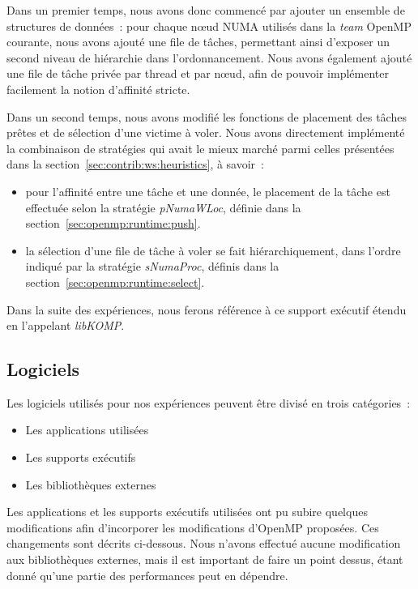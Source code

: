 Dans un premier temps, nous avons donc commencé par ajouter un ensemble de structures de données~: pour chaque nœud NUMA utilisés dans la \emph{team} OpenMP courante, nous avons ajouté une file de tâches, permettant ainsi d'exposer un second niveau de hiérarchie dans l'ordonnancement.
Nous avons également ajouté une file de tâche privée par thread et par nœud, afin de pouvoir implémenter facilement la notion d'affinité stricte.

Dans un second temps, nous avons modifié les fonctions de placement des tâches prêtes et de sélection d'une victime à voler.
Nous avons directement implémenté la combinaison de stratégies qui avait le mieux marché parmi celles présentées dans la section~\ref{sec:contrib:ws:heuristics}, à savoir~:
\begin{itemize}
  \item pour l'affinité entre une tâche et une donnée, le placement de la tâche est effectuée selon la stratégie \emph{pNumaWLoc}, définie dans la section~\ref{sec:openmp:runtime:push}.
  \item la sélection d'une file de tâche à voler se fait hiérarchiquement, dans l'ordre indiqué par la stratégie \emph{sNumaProc}, définis dans la section~\ref{sec:openmp:runtime:select}.
\end{itemize}

Dans la suite des expériences, nous ferons référence à ce support exécutif étendu en l'appelant \emph{libKOMP}.

\subsection{Logiciels}\label{sec:contribs:perf_eval:logiciels}

Les logiciels utilisés pour nos expériences peuvent être divisé en trois catégories~:
\begin{itemize}
  \item Les applications utilisées
  \item Les supports exécutifs
  \item Les bibliothèques externes
\end{itemize}

Les applications et les supports exécutifs utilisées ont pu subire quelques modifications afin d'incorporer les modifications d'OpenMP proposées.
Ces changements sont décrits ci-dessous.
Nous n'avons effectué aucune modification aux bibliothèques externes, mais il est important de faire un point dessus, étant donné qu'une partie des performances peut en dépendre.

